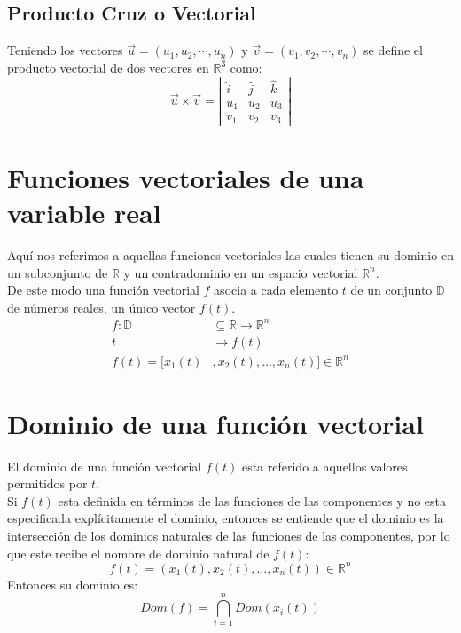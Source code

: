\documentclass[../main]{subfiles}
\begin{document}
\section{Producto Cruz o Vectorial}
Teniendo los vectores $\Vec{u}=(u_1,u_2,\cdots, u_n)$ y $\Vec{v}=(v_1,v_2,\cdots, v_n)$ se define el producto vectorial de dos vectores en $\mathbb{R}^3$ como:
\begin{equation}
    \vec{u} \times \vec{v}=\left |
    \begin{matrix}
    \hat{i} & \hat{j} & \hat{k} \\
    u_1     & u_2     & u_3 \\
    v_1     & v_2     & v_3
    \end{matrix}
    \right|
\end{equation}
\chapter{Funciones vectoriales de una variable real}
Aquí nos referimos a aquellas funciones vectoriales las cuales tienen su dominio en un subconjunto de $\mathbb{R}$ y un contradominio en un espacio vectorial $\mathbb{R}^n$. \\[0.2cm]
De este modo una función vectorial $f$ asocia a cada elemento $t$ de un conjunto $\mathbb{D}$ de números reales, un único vector $f(t)$.
\begin{align}
f:\mathbb{D} & \subseteq \mathbb{R} \rightarrow \mathbb{R}^n \nonumber \\
t & \rightarrow f(t) \nonumber \\
f(t) = [ x_1 (t) &, x_2 (t), \ldots , x_n (t) ] \in \mathbb{R}^n \nonumber
\end{align}
\chapter{Dominio de una función vectorial}
El dominio de una función vectorial $f(t)$ esta referido a aquellos valores permitidos por $t$.\\[0.2cm]
Si $f(t)$ esta definida en términos de las funciones de las componentes y no esta especificada explícitamente el dominio, entonces se entiende que el dominio es la intersección de los dominios naturales de las funciones de las componentes, por lo que este recibe el nombre de dominio natural de $f(t)$:
\begin{equation}
    f(t)=(x_1(t),x_2(t),\ldots,x_n(t)) \in \mathbb{R}^n
\end{equation}
Entonces su dominio es:
\begin{equation}
    Dom(f)=\bigcap_{i=1}^n Dom(x_i(t))
\end{equation}
\end{document}
